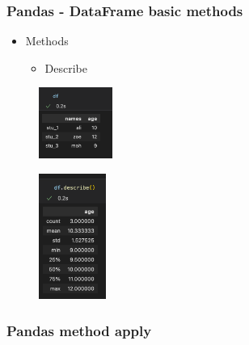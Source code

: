 \begin{frame}\frametitle{Pandas - DataFrame basic methods}
   \begin{minipage}{0.58\linewidth}
      \begin{itemize}
         \item Methods
         \begin{itemize}
            \item Describe
         \end{itemize}
      \end{itemize}
      \vspace{.5cm}
      \begin{figure}[H]
         \includegraphics[width=2.4cm]{../images/illustrations/pandas_df_ex.png}
      \end{figure}
   \end{minipage}
   \begin{minipage}{0.38\linewidth}
      \begin{figure}[H]
         \includegraphics[width=2.2cm]{../images/illustrations/pandas_describe.png}
      \end{figure}
   \end{minipage}
\end{frame}


\subsubsection{Pandas method apply}


